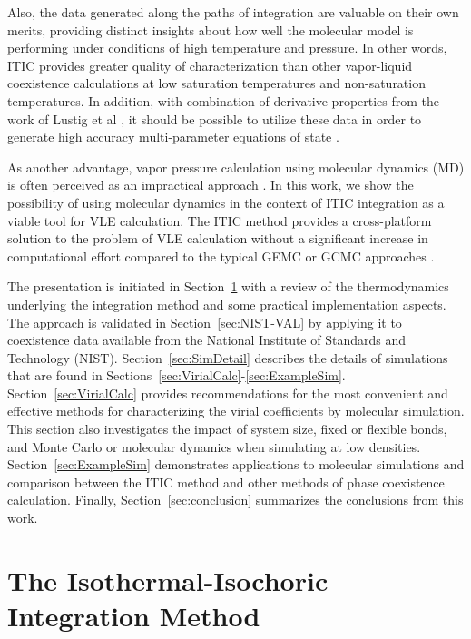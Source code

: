 \documentclass[5p,times]{elsarticle}
\begin{document}
Also, the data generated along the paths of integration are valuable on their own merits, providing distinct insights about how well the molecular model is performing under conditions of high temperature and pressure. In other words, ITIC provides greater quality of characterization than other vapor-liquid coexistence calculations at low saturation temperatures and non-saturation temperatures. In addition, with combination of derivative properties from the work of Lustig et al \cite{Lustig2015}, it should be possible to utilize these data in order to generate high accuracy multi-parameter equations of state \cite{Thol2016_LJ,Thol2016_siloxane,Thol2016_siloxane_first,Thol2017,Rutkai2013,Rutkai2015,Thol2015,Thol2015b}.

As another advantage, vapor pressure calculation using molecular dynamics (MD) is often perceived as an impractical approach \cite{Nieto-Draghi2015}. In this work, we show the possibility of using molecular dynamics in the context of ITIC integration as a viable tool for VLE calculation. The ITIC method provides a cross-platform solution to the problem of VLE calculation without a significant increase in computational effort compared to the typical GEMC or GCMC approaches \cite{Razavi2016,Messerly2018}.
 
The presentation is initiated in Section~\ref{sec:ITIC-method} with a review of the thermodynamics underlying the integration method and some practical implementation aspects. The approach is validated in Section~\ref{sec:NIST-VAL} by applying it to coexistence data available from the National Institute of Standards and Technology (NIST). Section~\ref{sec:SimDetail} describes the details of simulations that are found in Sections~\ref{sec:VirialCalc}-\ref{sec:ExampleSim}. Section~\ref{sec:VirialCalc} provides recommendations for the most convenient and effective methods for characterizing the virial coefficients by molecular simulation. This section also investigates the impact of system size, fixed or flexible bonds, and Monte Carlo or molecular dynamics when simulating at low densities. Section~\ref{sec:ExampleSim} demonstrates applications to molecular simulations and comparison between the ITIC method and other methods of phase coexistence calculation. Finally, Section~\ref{sec:conclusion} summarizes the conclusions from this work.

\section{The Isothermal-Isochoric Integration Method} \label{sec:ITIC-method}
\end{document}
